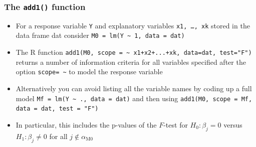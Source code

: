 \documentclass[a4paper]{article}
\begin{document}
\subsubsection{The \lstinline|add1()| function}
\begin{itemize}
	\item For a response variable \lstinline|Y| and explanatory variables \lstinline|x1, …, xk| stored in the data frame dat consider \lstinline|M0 = lm(Y ~ 1, data = dat)|
	\item The R function \lstinline|add1(M0, scope = ~ x1+x2+...+xk, data=dat, test="F")| returns a number of information criteria for all variables specified after the option \lstinline|scope= ~| to model the response variable
	\item Alternatively you can avoid listing all the variable names by coding up a full model \lstinline|Mf = lm(Y ~ ., data = dat)| and then using \lstinline|add1(M0, scope = Mf, data = dat, test = "F")|
	\item In particular, this includes the p-values of the \( F \)-test for \( H_0: \beta_j = 0 \) versus \( H_1: \beta_j \neq 0 \) for all \( j \notin \alpha_{\text{M0}} \)
\end{itemize}
\end{document}
